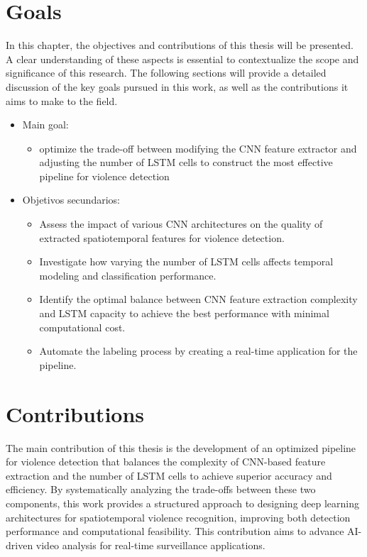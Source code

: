 
\section{Goals}
In this chapter, the objectives and contributions of this 
thesis will be presented. A clear understanding of these 
aspects is essential to contextualize the scope and significance 
of this research. The following sections will provide a 
detailed discussion of the key goals pursued in this work, as 
well as the contributions it aims to make to the field.
\begin{itemize}
  \item { Main goal: 
      \begin{itemize}
          \item optimize the trade-off between modifying 
          the CNN feature extractor and adjusting the number 
          of LSTM cells to construct the most effective pipeline 
          for violence detection
      \end{itemize}
   }
   \item { Objetivos secundarios:
      \begin{itemize}
          \item Assess the impact of various CNN architectures 
          on the quality of extracted spatiotemporal features 
          for violence detection.
          \item Investigate how varying the number of LSTM cells 
          affects temporal modeling and classification performance.
          \item Identify the optimal balance between CNN feature 
          extraction complexity and LSTM capacity to achieve the 
          best performance with minimal computational cost.
          \item Automate the labeling process by creating a 
          real-time application for the pipeline.
      \end{itemize}
      }
\end{itemize}

\section{Contributions}

The main contribution of this thesis is the development of 
an optimized pipeline for violence detection that balances 
the complexity of CNN-based feature extraction and the number 
of LSTM cells to achieve superior accuracy and efficiency. 
By systematically analyzing the trade-offs between these two 
components, this work provides a structured approach to 
designing deep learning architectures for spatiotemporal 
violence recognition, improving both detection performance 
and computational feasibility. This contribution aims to 
advance AI-driven video analysis for real-time surveillance 
applications.